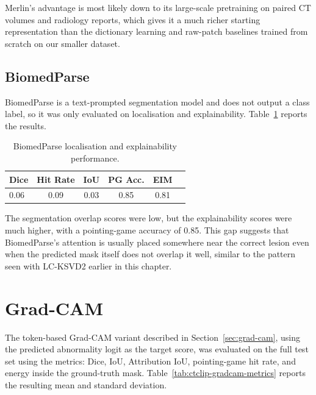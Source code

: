 Merlin's advantage is most likely down to its large-scale pretraining on paired CT volumes and
radiology reports, which gives it a much richer starting representation than the dictionary
learning and raw-patch baselines trained from scratch on our smaller dataset.

\subsection{BiomedParse}

BiomedParse is a text-prompted segmentation model and does not output a class label, so it was only
evaluated on localisation and explainability. Table~\ref{tab:biomedparse-localisation} reports the
results.

\begin{table}[H]
\centering
\caption{BiomedParse localisation and explainability performance.}
\label{tab:biomedparse-localisation}
\begin{tabular}{lccccc}
\hline
\textbf{Dice} & \textbf{Hit Rate} & \textbf{IoU} & \textbf{PG Acc.} & \textbf{EIM} \\
\hline
0.06 & 0.09 & 0.03 & 0.85 & 0.81 \\
\hline
\end{tabular}
\end{table}

The segmentation overlap scores were low, but the explainability scores were much higher, with a
pointing-game accuracy of 0.85. This gap suggests that BiomedParse's attention is usually placed
somewhere near the correct lesion even when the predicted mask itself does not overlap it well,
similar to the pattern seen with LC-KSVD2 earlier in this chapter.

\section{Grad-CAM}

The token-based Grad-CAM variant described in Section~\ref{sec:grad-cam}, using the predicted abnormality
logit as the target score, was evaluated on the full test set using the metrics:
Dice, IoU, Attribution IoU, pointing-game hit rate, and energy inside the ground-truth mask.
Table~\ref{tab:ctclip-gradcam-metrics} reports the resulting mean and standard deviation.

